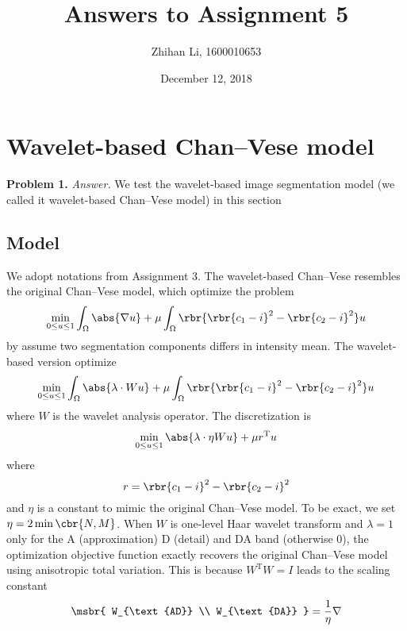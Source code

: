 \documentclass[english, nochinese]{pnote}
\title{Answers to Assignment 5}
\author{Zhihan Li, 1600010653}
\date{December 12, 2018}
\begin{document}
\maketitle

\section{Wavelet-based Chan--Vese model}

\textbf{Problem 1.} \textit{Answer.} We test the wavelet-based image segmentation model (we called it wavelet-based Chan--Vese model) in this section

\subsection{Model}

We adopt notations from Assignment 3. The wavelet-based Chan--Vese resembles the original Chan--Vese model, which optimize the problem
\begin{equation}
\min_{ 0 \le u \le 1 } \int_{\Omega} \abs{ \nabla u } + \mu \int_{\Omega} \rbr{ \rbr{ c_1 - i }^2 - \rbr{ c_2 - i }^2 } u
\end{equation}
by assume two segmentation components differs in intensity mean. The wavelet-based version optimize
\begin{equation}
\min_{ 0 \le u \le 1 } \int_{\Omega} \abs{ \lambda \cdot W u } + \mu \int_{\Omega} \rbr{ \rbr{ c_1 - i }^2 - \rbr{ c_2 - i }^2 } u
\end{equation}
where $W$ is the wavelet analysis operator. The discretization is
\begin{equation}
\min_{ 0 \le u \le 1 } \abs{ \lambda \cdot \eta W u } + \mu r^{\text{T}} u
\end{equation}
where
\begin{equation}
r = \rbr{ c_1 - i }^2 - \rbr{ c_2 - i }^2
\end{equation}
and $\eta$ is a constant to mimic the original Chan--Vese model. To be exact, we set $ \eta = 2 \min \cbr{ N, M } $. When $W$ is one-level Haar wavelet transform and $ \lambda = 1 $ only for the A (approximation) D (detail) and DA band (otherwise $0$), the optimization objective function exactly recovers the original Chan--Vese model using anisotropic total variation. This is because $ W^{\text{T}} W = I $ leads to the scaling constant
\begin{equation}
\msbr{ W_{\text{AD}} \\ W_{\text{DA}} } = \frac{1}{\eta} \nabla
\end{equation}
\end{document}
